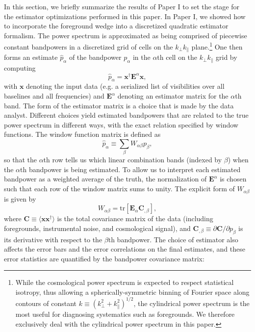 \documentclass[twocolumn,aps,prd,nofootinbib,showpacs]{revtex4-1}
\begin{document}
In this section, we briefly summarize the results of Paper I to set the stage for the estimator optimizations performed in this paper.  In Paper I, we showed how to incorporate the foreground wedge into a discretized quadratic estimator formalism.  The power spectrum is approximated as being comprised of piecewise constant bandpowers in a discretized grid of cells on the $k_\perp k_\parallel$ plane.\footnote{While the cosmological power spectrum is expected to respect statistical isotropy, thus allowing a spherically-symmetric binning of Fourier space along contours of constant $k\equiv (k_\perp^2 + k_\parallel^2)^{1/2}$, the cylindrical power spectrum is the most useful for diagnosing systematics such as foregrounds.  We therefore exclusively deal with the cylindrical power spectrum in this paper.}  One then forms an estimate $\widehat{p}_\alpha$ of the bandpower $p_\alpha$ in the $\alpha$th cell on the $k_\perp k_\parallel$ grid by computing
\begin{equation}
\label{eq:GenericEst}
\widehat{p}_\alpha = \mathbf{x}^\dagger \mathbf{E}^\alpha \mathbf{x},
\end{equation}
with $\mathbf{x}$ denoting the input data (e.g. a serialized list of visibilities over all baselines and all frequencies) and $\mathbf{E}^\alpha$ denoting an estimator matrix for the $\alpha$th band.  The form of the estimator matrix is a choice that is made by the data analyst.  Different choices yield estimated bandpowers that are related to the true power spectrum in different ways, with the exact relation specified by window functions.  The window function matrix is defined as
\begin{equation}
\label{eq:WindDef}
\widehat{p}_\alpha \equiv \sum_\beta W_{\alpha \beta} p_\beta,
\end{equation}
so that the $\alpha$th row tells us which linear combination bands (indexed by $\beta$) when the $\alpha$th bandpower is being estimated.  To allow us to interpret each estimated bandpower as a weighted average of the truth, the normalization of $\mathbf{E}^\alpha$ is chosen such that each row of the window matrix sums to unity.  The explicit form of $W_{\alpha \beta}$ is given by
\begin{equation}
\label{eq:WindExplicitForm}
W_{\alpha \beta} = \textrm{tr} \left[ \mathbf{E}_\alpha \mathbf{C}_{,\beta} \right],
\end{equation}
where $\mathbf{C} \equiv \langle \mathbf{x} \mathbf{x}^\dagger \rangle$ is the total covariance matrix of the data (including foregrounds, instrumental noise, and cosmological signal), and $\mathbf{C}_{,\beta} \equiv \partial \mathbf{C} / \partial p_\beta$ is its derivative with respect to the $\beta$th bandpower.  The choice of estimator also affects the error bars and the error correlations on the final estimates, and these error statistics are quantified by the bandpower covariance matrix:
\end{document}
